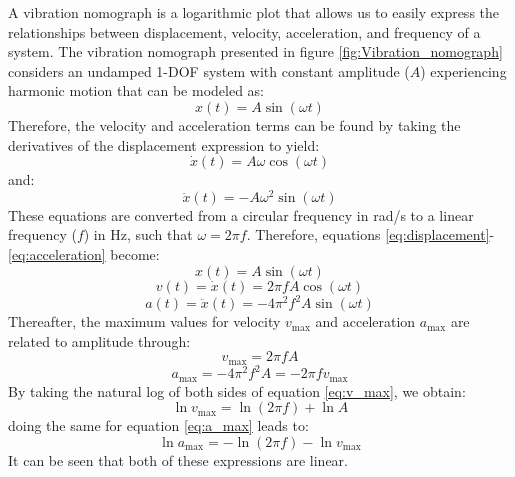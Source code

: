\documentclass[12pt,letter]{article}
\begin{document}
A vibration nomograph is a logarithmic plot that allows us to easily express the relationships between displacement, velocity, acceleration, and frequency of a system. The vibration nomograph presented in figure \ref{fig:Vibration_nomograph} considers an undamped 1-DOF system with constant amplitude ($A$) experiencing harmonic motion that can be modeled as:
\begin{equation}
    x(t) = A \sin(\omega t)
    \label{eq:displacement}
\end{equation}
Therefore, the velocity and acceleration terms can be found by taking the derivatives of the displacement expression to yield:
\begin{equation}
    \dot{x}(t) = A \omega \cos(\omega t)
\end{equation}
and:
\begin{equation}
    \ddot{x}(t) = -A\omega^2 \sin(\omega t)
    \label{eq:acceleration}
\end{equation}
These equations are converted from a circular frequency in rad/s to a linear frequency ($f$) in Hz, such that $\omega = 2\pi f$. Therefore, equations \ref{eq:displacement}-\ref{eq:acceleration} become:
\begin{equation}
    x(t) = A \sin(\omega t)
\end{equation}
\begin{equation}
    v(t) =  \dot{x}(t) = 2\pi f A \cos(\omega t)
\end{equation}
\begin{equation}
    a(t) =  \ddot{x}(t) = -4\pi^2 f^2 A \sin(\omega t)
\end{equation}
Thereafter, the maximum values for velocity $v_\text{max}$ and acceleration $a_\text{max}$ are related to amplitude through:
\begin{equation}
    v_\text{max} = 2\pi f A 
    \label{eq:v_max}
\end{equation}
\begin{equation}
    a_\text{max} = -4\pi^2 f^2 A = -2 \pi f v_\text{max}
    \label{eq:a_max}
\end{equation}
By taking the natural log of both sides of equation \ref{eq:v_max}, we obtain: 
\begin{equation}
    \ln v_\text{max} = \ln(2\pi f) + \ln A
    \label{eq:ln_v_max} 
\end{equation}
doing the same for equation \ref{eq:a_max} leads to:
\begin{equation}
     \ln a_\text{max} = - \ln(2\pi f) - \ln v_\text{max}
    \label{eq:ln_v_max_2} 
\end{equation}
It can be seen that both of these expressions are linear. 
\end{document}
